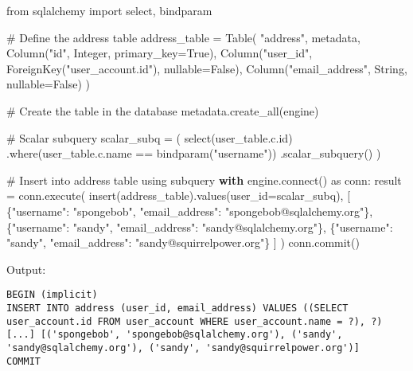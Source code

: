 \documentclass[
  letterpaper,
  DIV=11,
  numbers=noendperiod]{scrreprt}
\newenvironment{Shaded}{\begin{snugshade}}{\end{snugshade}}
\newcommand{\BuiltInTok}[1]{\textcolor[rgb]{0.00,0.23,0.31}{#1}}
\newcommand{\CommentTok}[1]{\textcolor[rgb]{0.37,0.37,0.37}{#1}}
\newcommand{\ControlFlowTok}[1]{\textcolor[rgb]{0.00,0.23,0.31}{\textbf{#1}}}
\newcommand{\ExtensionTok}[1]{\textcolor[rgb]{0.00,0.23,0.31}{#1}}
\newcommand{\ImportTok}[1]{\textcolor[rgb]{0.00,0.46,0.62}{#1}}
\newcommand{\NormalTok}[1]{\textcolor[rgb]{0.00,0.23,0.31}{#1}}
\newcommand{\OperatorTok}[1]{\textcolor[rgb]{0.37,0.37,0.37}{#1}}
\newcommand{\StringTok}[1]{\textcolor[rgb]{0.13,0.47,0.30}{#1}}
\newcommand{\VariableTok}[1]{\textcolor[rgb]{0.07,0.07,0.07}{#1}}
\begin{document}
\begin{Shaded}
\begin{Highlighting}[]
\ImportTok{from}\NormalTok{ sqlalchemy }\ImportTok{import}\NormalTok{ select, bindparam}

\CommentTok{\# Define the address table}
\NormalTok{address\_table }\OperatorTok{=}\NormalTok{ Table(}
    \StringTok{"address"}\NormalTok{, metadata,}
\NormalTok{    Column(}\StringTok{"id"}\NormalTok{, Integer, primary\_key}\OperatorTok{=}\VariableTok{True}\NormalTok{),}
\NormalTok{    Column(}\StringTok{"user\_id"}\NormalTok{, ForeignKey(}\StringTok{"user\_account.id"}\NormalTok{), nullable}\OperatorTok{=}\VariableTok{False}\NormalTok{),}
\NormalTok{    Column(}\StringTok{"email\_address"}\NormalTok{, String, nullable}\OperatorTok{=}\VariableTok{False}\NormalTok{)}
\NormalTok{)}

\CommentTok{\# Create the table in the database}
\NormalTok{metadata.create\_all(engine)}

\CommentTok{\# Scalar subquery}
\NormalTok{scalar\_subq }\OperatorTok{=}\NormalTok{ (}
\NormalTok{    select(user\_table.c.}\BuiltInTok{id}\NormalTok{)}
\NormalTok{    .where(user\_table.c.name }\OperatorTok{==}\NormalTok{ bindparam(}\StringTok{"username"}\NormalTok{))}
\NormalTok{    .scalar\_subquery()}
\NormalTok{)}

\CommentTok{\# Insert into address table using subquery}
\ControlFlowTok{with}\NormalTok{ engine.}\ExtensionTok{connect}\NormalTok{() }\ImportTok{as}\NormalTok{ conn:}
\NormalTok{    result }\OperatorTok{=}\NormalTok{ conn.execute(}
\NormalTok{        insert(address\_table).values(user\_id}\OperatorTok{=}\NormalTok{scalar\_subq),}
\NormalTok{        [}
\NormalTok{            \{}\StringTok{"username"}\NormalTok{: }\StringTok{"spongebob"}\NormalTok{, }\StringTok{"email\_address"}\NormalTok{: }\StringTok{"spongebob@sqlalchemy.org"}\NormalTok{\},}
\NormalTok{            \{}\StringTok{"username"}\NormalTok{: }\StringTok{"sandy"}\NormalTok{, }\StringTok{"email\_address"}\NormalTok{: }\StringTok{"sandy@sqlalchemy.org"}\NormalTok{\},}
\NormalTok{            \{}\StringTok{"username"}\NormalTok{: }\StringTok{"sandy"}\NormalTok{, }\StringTok{"email\_address"}\NormalTok{: }\StringTok{"sandy@squirrelpower.org"}\NormalTok{\}}
\NormalTok{        ]}
\NormalTok{    )}
\NormalTok{    conn.commit()}
\end{Highlighting}
\end{Shaded}

Output:

\begin{verbatim}
BEGIN (implicit)
INSERT INTO address (user_id, email_address) VALUES ((SELECT user_account.id FROM user_account WHERE user_account.name = ?), ?)
[...] [('spongebob', 'spongebob@sqlalchemy.org'), ('sandy', 'sandy@sqlalchemy.org'), ('sandy', 'sandy@squirrelpower.org')]
COMMIT
\end{verbatim}
\end{document}
